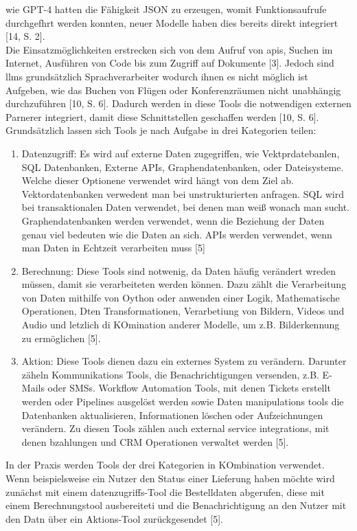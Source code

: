 wie GPT-4 hatten die Fähigkeit JSON zu erzeugen, womit Funktionsaufrufe durchgefhrt werden konnten, neuer Modelle haben dies bereits direkt integriert [14, S. 2]. \\
Die Einsatzmöglichkeiten erstrecken sich von dem Aufruf von \ac{api}s, Suchen im Internet, Ausführen von Code bis zum Zugriff auf Dokumente [3]. Jedoch sind \ac{llm}s
grundsätzlich Sprachverarbeiter wodurch ihnen es nicht möglich ist Aufgeben, wie das Buchen von Flügen oder Konferenzräumen nicht unabhängig durchzuführen [10, S. 6].
Dadurch werden in diese Tools die notwendigen externen Parnerer integriert, damit diese Schnittstellen geschaffen werden [10, S. 6]. Grundsätzlich lassen sich 
Tools je nach Aufgabe in drei Kategorien teilen: 

\begin{enumerate}
    \item Datenzugriff: Es wird auf externe Daten zugegriffen, wie Vektprdatebanlen, SQL Datenbanken, Externe APIs, Graphendatenbanken, oder Dateisysteme. 
    Welche dieser Optionene verwendet wird hängt von dem Ziel ab. Vektordatenbanken verwedent man bei unstrukturierten anfragen. SQL wird bei transaktionalen Daten 
    verwendet, bei denen man weiß wonach man sucht. Graphendatenbanken werden verwendet, wenn die Beziehung der Daten genau viel bedeuten wie die Daten an sich. 
    APIs werden verwendet, wenn man Daten in Echtzeit verarbeiten muss [5]
    \item Berechnung: Diese Tools sind notwenig, da Daten häufig verändert wreden müssen, damit sie verarbeiteten werden können.  Dazu zählt die Verarbeitung
    von Daten mithilfe von Oython oder anwenden einer Logik, Mathematische Operationen, Dten Transformationen, Verarbetiung von Bildern, Videos und Audio und letzlich
    di KOmination anderer Modelle, um z.B. Bilderkennung zu ermöglichen [5].
    \item Aktion: Diese Tools dienen dazu ein externes System zu verändern. Darunter zäheln Kommunikations Tools, die Benachrichtigungen versenden, z.B. E-Mails oder
    SMSs. Workflow Automation Tools, mit denen Tickets erstellt werden oder Pipelines ausgelöst werden sowie Daten manipulations tools die Datenbanken aktualisieren,
    Informationen löschen oder Aufzeichnungen verändern. Zu diesen Tools zählen auch external service integrations, mit denen bzahlungen und CRM Operationen
    verwaltet werden [5].
\end{enumerate}

In der Praxis werden Tools der drei Kategorien in KOmbination verwendet. Wenn beispielsweise ein Nutzer den Status einer Lieferung haben möchte wird zunächst
mit einem datenzugriffs-Tool die Bestelldaten abgerufen, diese mit einem Berechnungstool ausbereiteti und die Benachrichtigung an den Nutzer mit den Datn
über ein Aktions-Tool zurückgesendet [5].

